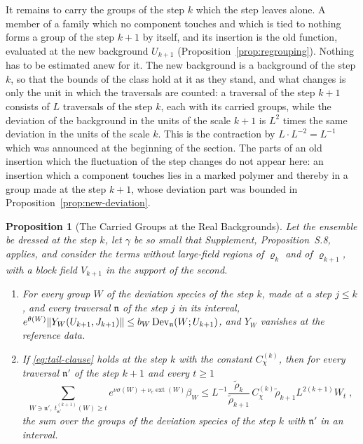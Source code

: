 \documentclass[11pt]{preprint}
\DeclarePairedDelimiter{\norm}{\lVert}{\rVert}
\numberwithin{equation}{section}
\newtheorem{proposition}[theorem]{Proposition}
\theoremstyle{definition}
\theoremstyle{remark}
\theoremstyle{plain}
\begin{document}
It remains to carry the groups of the step $k$ which the step leaves alone. A member of a family which no component touches and which is tied to nothing forms a group of the step $k + 1$ by itself, and its insertion is the old function, evaluated at the new background $U_{k+1}$ (Proposition~\ref{prop:regrouping}). Nothing has to be estimated anew for it. The new background is a background of the step $k$, so that the bounds of the class hold at it as they stand, and what changes is only the unit in which the traversals are counted: a traversal of the step $k + 1$ consists of $L$ traversals of the step $k$, each with its carried groups, while the deviation of the background in the units of the scale $k + 1$ is $L^2$ times the same deviation in the units of the scale $k$. This is the contraction by $L \cdot L^{-2} = L^{-1}$ which was announced at the beginning of the section. The parts of an old insertion which the fluctuation of the step changes do not appear here: an insertion which a component touches lies in a marked polymer and thereby in a group made at the step $k + 1$, whose deviation part was bounded in Proposition~\ref{prop:new-deviation}.

\begin{proposition}[The Carried Groups at the Real Backgrounds]\label{prop:carried-real}
Let the ensemble be dressed at the step $k$, let $\gamma$ be so small that Supplement, Proposition~S.8, applies, and consider the terms without large-field regions of $\varrho_k$ and of $\varrho_{k+1}$, with a block field $V_{k+1}$ in the support of the second.
\begin{enumerate}[label=(\roman*)]
\item For every group $W$ of the deviation species of the step $k$, made at a step $j \leq k$, and every traversal $\mathfrak n$ of the step $j$ in its interval, $e^{\theta(W)}\norm{Y_W(U_{k+1}, J_{k+1})} \leq b_W\operatorname{Dev}_{\mathfrak n}(W; U_{k+1})$, and $Y_W$ vanishes at the reference data.
\item If \eqref{eq:tail-clause} holds at the step $k$ with the constant $C^{(k)}_\chi$, then for every traversal $\mathfrak n'$ of the step $k + 1$ and every $t \geq 1$
\begin{equation}\label{eq:contraction-first}
    \sum_{W \ni \mathfrak n',\ t^{(k+1)}_{\mathfrak n'}(W) \geq t}e^{\nu\sigma(W) + \nu_e\operatorname{ext}(W)}\beta_W \leq L^{-1}\frac{\tilde\rho_k}{\tilde\rho_{k+1}}\,C^{(k)}_\chi\tilde\rho_{k+1}L^{2(k+1)}W_t\;,
\end{equation}
the sum over the groups of the deviation species of the step $k$ with $\mathfrak n'$ in an interval.
\end{enumerate}
\end{proposition}
\end{document}

